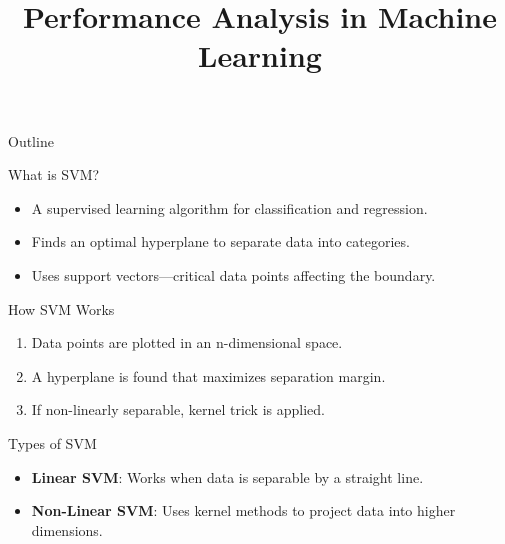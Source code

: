 \documentclass{beamer}
\title{Performance Analysis in Machine Learning}
\subtitle{}
\date{}
\begin{document}
{
\begin{frame}
    \titlepage
\end{frame}
}

\begin{frame}{Outline}
    \tableofcontents
\end{frame}

\begin{frame}{What is SVM?}
    \begin{itemize}
        \item A supervised learning algorithm for classification and regression.
        \item Finds an optimal hyperplane to separate data into categories.
        \item Uses support vectors—critical data points affecting the boundary.
    \end{itemize}
\end{frame}

\begin{frame}{How SVM Works}
    \begin{enumerate}
        \item Data points are plotted in an n-dimensional space.
        \item A hyperplane is found that maximizes separation margin.
        \item If non-linearly separable, kernel trick is applied.
    \end{enumerate}
\end{frame}

\begin{frame}{Types of SVM}
    \begin{itemize}
        \item \textbf{Linear SVM}: Works when data is separable by a straight line.
        \item \textbf{Non-Linear SVM}: Uses kernel methods to project data into higher dimensions.
    \end{itemize}
\end{frame}
\end{document}
